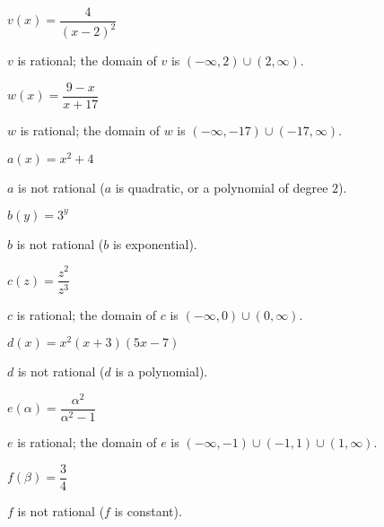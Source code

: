 \begin{exercises}
\begin{problem}
\begin{multicols}{3}
	\begin{subproblem}
		$v(x)=\dfrac{4}{(x-2)^2}$
		\begin{shortsolution}
			$v$ is rational; the domain of $v$ is $(-\infty,2)\cup(2,\infty)$.
		\end{shortsolution}
	\end{subproblem}
	\begin{subproblem}
		$w(x)=\dfrac{9-x}{x+17}$
		\begin{shortsolution}
			$w$ is rational; the domain of $w$ is $(-\infty,-17)\cup(-17,\infty)$.
		\end{shortsolution}
	\end{subproblem}
	\begin{subproblem}
		$a(x)=x^2+4$
		\begin{shortsolution}
			$a$ is not rational ($a$ is quadratic, or a polynomial of degree $2$).
		\end{shortsolution}
	\end{subproblem}
	\begin{subproblem}
		$b(y)=3^y$
		\begin{shortsolution}
			$b$ is not rational ($b$ is exponential).
		\end{shortsolution}
	\end{subproblem}
	\begin{subproblem}
		$c(z)=\dfrac{z^2}{z^3}$
		\begin{shortsolution}
			$c$ is rational; the domain of $c$ is $(-\infty,0)\cup (0,\infty)$.
		\end{shortsolution}
	\end{subproblem}
	\begin{subproblem}
		$d(x)=x^2(x+3)(5x-7)$
		\begin{shortsolution}
			$d$ is not rational ($d$ is a polynomial).
		\end{shortsolution}
	\end{subproblem}
	\begin{subproblem}
		$e(\alpha)=\dfrac{\alpha^2}{\alpha^2-1}$
		\begin{shortsolution}
			$e$ is rational; the domain of $e$ is $(-\infty,-1)\cup(-1,1)\cup(1,\infty)$.
		\end{shortsolution}
	\end{subproblem}
	\begin{subproblem}
		$f(\beta)=\dfrac{3}{4}$
		\begin{shortsolution}
			$f$ is not rational ($f$ is constant).
		\end{shortsolution}
	\end{subproblem}

\end{multicols}
\end{problem}
\end{exercises}
